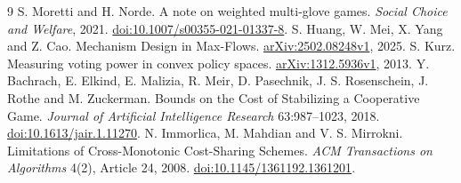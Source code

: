 \documentclass[11pt]{article}
\theoremstyle{definition}\newtheorem{definition}[theorem]{Definition}
\theoremstyle{remark}\newtheorem{remark}[theorem]{Remark}
\begin{document}
\begin{thebibliography}{9}
S. Moretti and H. Norde.
A note on weighted multi-glove games.
\emph{Social Choice and Welfare}, 2021.
\href{https://doi.org/10.1007/s00355-021-01337-8}{doi:10.1007/s00355-021-01337-8}.
S. Huang, W. Mei, X. Yang and Z. Cao.
Mechanism Design in Max-Flows.
\href{https://arxiv.org/abs/2502.08248}{arXiv:2502.08248v1}, 2025.
S. Kurz. Measuring voting power in convex policy spaces.
\href{https://arxiv.org/abs/1312.5936}{arXiv:1312.5936v1}, 2013.
Y. Bachrach, E. Elkind, E. Malizia, R. Meir, D. Pasechnik,
J. S. Rosenschein, J. Rothe and M. Zuckerman.
Bounds on the Cost of Stabilizing a Cooperative Game.
\emph{Journal of Artificial Intelligence Research} 63:987--1023, 2018.
\href{https://doi.org/10.1613/jair.1.11270}{doi:10.1613/jair.1.11270}.
N. Immorlica, M. Mahdian and V. S. Mirrokni.
Limitations of Cross-Monotonic Cost-Sharing Schemes.
\emph{ACM Transactions on Algorithms} 4(2), Article 24, 2008.
\href{https://doi.org/10.1145/1361192.1361201}{doi:10.1145/1361192.1361201}.
\end{thebibliography}
\end{document}
